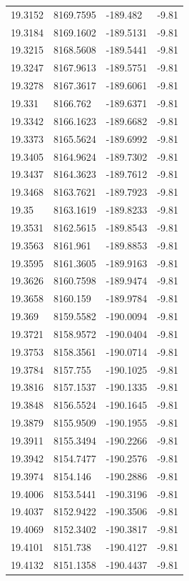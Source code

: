 \begin{table}[H]
\begin{tabular}{llll}
19.3152 & 8169.7595 & -189.482 & -9.81 \\
19.3184 & 8169.1602 & -189.5131 & -9.81 \\
19.3215 & 8168.5608 & -189.5441 & -9.81 \\
19.3247 & 8167.9613 & -189.5751 & -9.81 \\
19.3278 & 8167.3617 & -189.6061 & -9.81 \\
19.331 & 8166.762 & -189.6371 & -9.81 \\
19.3342 & 8166.1623 & -189.6682 & -9.81 \\
19.3373 & 8165.5624 & -189.6992 & -9.81 \\
19.3405 & 8164.9624 & -189.7302 & -9.81 \\
19.3437 & 8164.3623 & -189.7612 & -9.81 \\
19.3468 & 8163.7621 & -189.7923 & -9.81 \\
19.35 & 8163.1619 & -189.8233 & -9.81 \\
19.3531 & 8162.5615 & -189.8543 & -9.81 \\
19.3563 & 8161.961 & -189.8853 & -9.81 \\
19.3595 & 8161.3605 & -189.9163 & -9.81 \\
19.3626 & 8160.7598 & -189.9474 & -9.81 \\
19.3658 & 8160.159 & -189.9784 & -9.81 \\
19.369 & 8159.5582 & -190.0094 & -9.81 \\
19.3721 & 8158.9572 & -190.0404 & -9.81 \\
19.3753 & 8158.3561 & -190.0714 & -9.81 \\
19.3784 & 8157.755 & -190.1025 & -9.81 \\
19.3816 & 8157.1537 & -190.1335 & -9.81 \\
19.3848 & 8156.5524 & -190.1645 & -9.81 \\
19.3879 & 8155.9509 & -190.1955 & -9.81 \\
19.3911 & 8155.3494 & -190.2266 & -9.81 \\
19.3942 & 8154.7477 & -190.2576 & -9.81 \\
19.3974 & 8154.146 & -190.2886 & -9.81 \\
19.4006 & 8153.5441 & -190.3196 & -9.81 \\
19.4037 & 8152.9422 & -190.3506 & -9.81 \\
19.4069 & 8152.3402 & -190.3817 & -9.81 \\
19.4101 & 8151.738 & -190.4127 & -9.81 \\
19.4132 & 8151.1358 & -190.4437 & -9.81 \\

\end{tabular}
\end{table}
